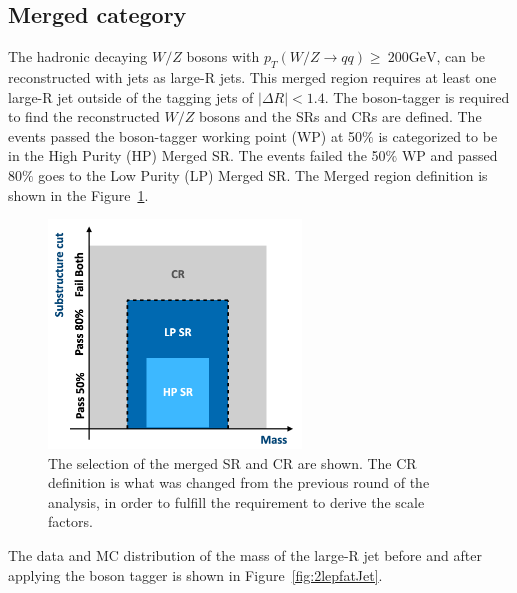 \subsection{Merged category}
The hadronic decaying $W/Z$ bosons with $p_{T}(W / Z \rightarrow q q) \geq ~200 \mathrm{GeV}$, can be reconstructed with jets as large-R jets. This merged region requires at least one large-R jet outside of the tagging jets of $|\Delta R|<1.4$. 
The boson-tagger is required to find the reconstructed $W/Z$ bosons and the SRs and CRs are defined. The events passed the boson-tagger working point (WP) at 50$\%$ is categorized to be in the High Purity (HP) Merged SR. The events failed the 50$\%$ WP and passed 80$\%$ goes to the Low Purity (LP) Merged SR. 
The Merged region definition is shown in the Figure~\ref{fig:MergedRegion}.
\begin{figure}[H]
    \centering
    \includegraphics[width=0.6\textwidth]{figures/MergedRegion}
    \caption{The selection of the merged SR and CR are shown. The CR definition is what was changed from the previous round of the analysis, in order to fulfill the requirement to derive the scale factors.}
    \label{fig:MergedRegion}
\end{figure}
The data and MC distribution of the mass of the large-R jet before and after applying the boson tagger is shown in Figure~\ref{fig:2lepfatJet}.
